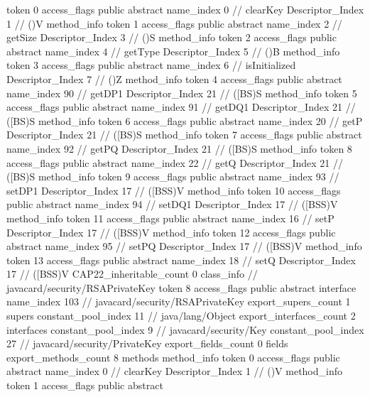 {{{{{					token	0
					access_flags	public abstract
					name_index	0		// clearKey
					Descriptor_Index	1		// ()V
				}
				method_info {
					token	1
					access_flags	public abstract
					name_index	2		// getSize
					Descriptor_Index	3		// ()S
				}
				method_info {
					token	2
					access_flags	public abstract
					name_index	4		// getType
					Descriptor_Index	5		// ()B
				}
				method_info {
					token	3
					access_flags	public abstract
					name_index	6		// isInitialized
					Descriptor_Index	7		// ()Z
				}
				method_info {
					token	4
					access_flags	public abstract
					name_index	90		// getDP1
					Descriptor_Index	21		// ([BS)S
				}
				method_info {
					token	5
					access_flags	public abstract
					name_index	91		// getDQ1
					Descriptor_Index	21		// ([BS)S
				}
				method_info {
					token	6
					access_flags	public abstract
					name_index	20		// getP
					Descriptor_Index	21		// ([BS)S
				}
				method_info {
					token	7
					access_flags	public abstract
					name_index	92		// getPQ
					Descriptor_Index	21		// ([BS)S
				}
				method_info {
					token	8
					access_flags	public abstract
					name_index	22		// getQ
					Descriptor_Index	21		// ([BS)S
				}
				method_info {
					token	9
					access_flags	public abstract
					name_index	93		// setDP1
					Descriptor_Index	17		// ([BSS)V
				}
				method_info {
					token	10
					access_flags	public abstract
					name_index	94		// setDQ1
					Descriptor_Index	17		// ([BSS)V
				}
				method_info {
					token	11
					access_flags	public abstract
					name_index	16		// setP
					Descriptor_Index	17		// ([BSS)V
				}
				method_info {
					token	12
					access_flags	public abstract
					name_index	95		// setPQ
					Descriptor_Index	17		// ([BSS)V
				}
				method_info {
					token	13
					access_flags	public abstract
					name_index	18		// setQ
					Descriptor_Index	17		// ([BSS)V
				}
			}
			CAP22_inheritable_count	0
		}
		class_info {		// javacard/security/RSAPrivateKey
			token	8
			access_flags	public abstract interface
			name_index	103		// javacard/security/RSAPrivateKey
			export_supers_count	1
			supers {
				constant_pool_index	11		// java/lang/Object
			}
			export_interfaces_count	2
			interfaces {
				constant_pool_index	9		// javacard/security/Key
				constant_pool_index	27		// javacard/security/PrivateKey
			}
			export_fields_count	0
			fields {
			}
			export_methods_count	8
			methods {
				method_info {
					token	0
					access_flags	public abstract
					name_index	0		// clearKey
					Descriptor_Index	1		// ()V
				}
				method_info {
					token	1
					access_flags	public abstract
}}}}}
